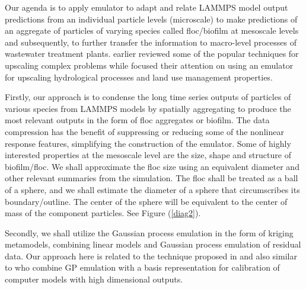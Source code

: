 \documentclass[12pt,titlepage]{report}
\theoremstyle{definition}
\theoremstyle{remark}
\begin{document}
Our agenda is to apply emulator to adapt and relate LAMMPS model output predictions from an individual particle levels (microscale) to make predictions of an aggregate of particles of varying species called floc/biofilm at mesoscale levels and subsequently, to further transfer the information to macro-level processes of wastewater treatment plants. \citet{l9} earlier reviewed some of the popular techniques for upscaling complex problems while \citet{l4,l8} focused their attention on using an emulator for upscaling hydrological processes and land use management properties.

Firstly, our approach is to condense the long time series outputs of particles of various species from LAMMPS models by spatially aggregating to produce the most relevant outputs in the form of floc aggregates or biofilm. The data compression has the benefit of suppressing or reducing some of the nonlinear response features, simplifying the construction of the emulator. 
Some of highly interested properties at the mesoscale level are the size, shape and structure of biofilm/floc. We shall approximate the floc size using an equivalent diameter and other relevant summaries from the simulation. The floc shall be treated as a ball of a sphere, and we shall estimate the diameter of a sphere that circumscribes its boundary/outline. The center of the sphere will be equivalent to the center of mass of the component particles. See Figure (\ref{diag2}).

Secondly, we shall utilize the Gaussian process emulation in the form of kriging metamodels, combining linear models and Gaussian process emulation of residual data. Our approach here is related to the technique proposed in \citet{l5,l7} and also similar to \citet{l6} who combine GP emulation with a basis representation for calibration of computer models with high dimensional outputs.
\end{document}
